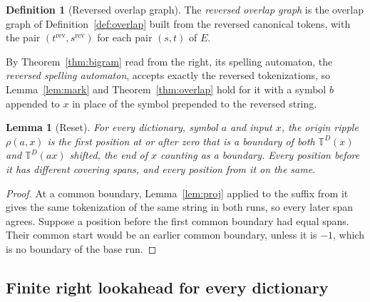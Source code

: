 \documentclass[11pt,a4paper]{article}
\theoremstyle{definition}
\newtheorem{definition}{Definition}
\theoremstyle{plain}
\newtheorem{lemma}{Lemma}
\newcommand{\T}{\mathbb{T}}
\begin{document}
\begin{definition}[Reversed overlap graph]\label{def:revoverlap}
The \emph{reversed overlap graph} is the overlap graph of Definition~\ref{def:overlap} built from the reversed canonical
tokens, with the pair \((t^{\mathrm{rev}}, s^{\mathrm{rev}})\) for each pair \((s, t)\) of \(E\).
\end{definition}

By Theorem~\ref{thm:bigram} read from the right, its spelling automaton, the \emph{reversed spelling automaton}, accepts
exactly the reversed tokenizations, so Lemma~\ref{lem:mark} and Theorem~\ref{thm:overlap} hold for it with a symbol
\(b\) appended to \(x\) in place of the symbol prepended to the reversed string.

\begin{lemma}[Reset]\label{lem:reset}
For every dictionary, symbol \(a\) and input \(x\), the origin ripple \(\rho(a, x)\) is the first position at or after
zero that is a boundary of both \(\T^D(x)\) and \(\T^D(ax)\) shifted, the end of \(x\) counting as a boundary. Every
position before it has different covering spans, and every position from it on the same.
\end{lemma}

\begin{proof}
At a common boundary, Lemma~\ref{lem:proj} applied to the suffix from it gives the same tokenization of the same string
in both runs, so every later span agrees. Suppose a position before the first common boundary had equal spans. Their
common start would be an earlier common boundary, unless it is \(-1\), which is no boundary of the base run.
\end{proof}

\subsection{Finite right lookahead for every dictionary}\label{sec:lookahead}
\end{document}
